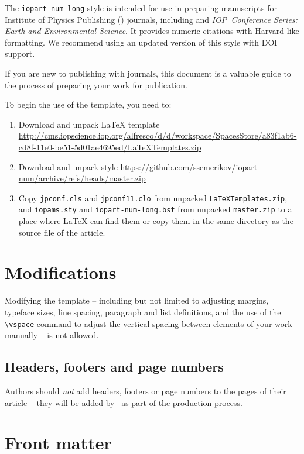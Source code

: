 \documentclass[a4paper]{jpconf}
\begin{document}
The \verb"iopart-num-long" \BibTeX{} style is intended for use in preparing manuscripts for Institute of Physics Publishing (\iopp{}) journals, including \jpcs{} and \textit{IOP~Conference Series: Earth and Environmental Science}. It provides numeric citations with Harvard-like formatting. We recommend using an updated version of this style with DOI support.

If you are new to publishing with \iopp{} journals, this document is a valuable guide to the process of preparing your work for publication.

To begin the use of the template, you need to:

\begin{enumerate}[label=\arabic*.]
 \item Download and unpack \LaTeX{} template  \url{http://cms.iopscience.iop.org/alfresco/d/d/workspace/SpacesStore/a83f1ab6-cd8f-11e0-be51-5d01ae4695ed/LaTeXTemplates.zip}
 \item Download and unpack \BibTeX{} style  \url{https://github.com/ssemerikov/iopart-num/archive/refs/heads/master.zip}
 \item Copy \verb|jpconf.cls| and \verb|jpconf11.clo| from unpacked \verb|LaTeXTemplates.zip|, and \verb|iopams.sty| and \verb|iopart-num-long.bst| from unpacked \verb|master.zip| to a place where \LaTeX{} can find them or copy them in the same directory as the source file of the article.
\end{enumerate}


\section{Modifications}

Modifying the template -- including but not limited to adjusting margins, typeface sizes, line spacing, paragraph and list definitions, and the use of the \verb|\vspace| command to adjust the vertical spacing between elements of your work manually -- is not allowed.

\subsection{Headers, footers and page numbers}
Authors should {\it not} add headers, footers or page numbers to the pages of their article -- they will be added by \iopp\ as part of the production process.


\section{Front matter}
\label{fpage}
\end{document}
